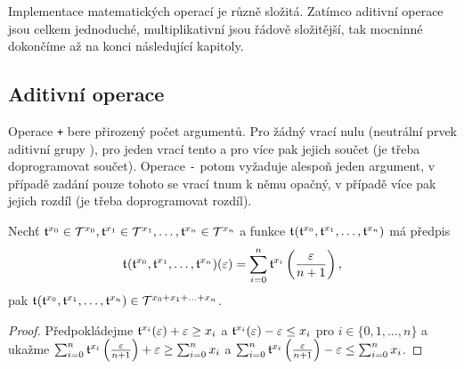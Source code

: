 Implementace matematických operací je různě složitá. Zatímco aditivní operace jsou celkem jednoduché, multiplikativní jsou řádově složitější, tak mocninné dokončíme až na konci následující kapitoly.

\subsection{Aditivní operace}
Operace \texttt{+} bere přirozený počet argumentů. Pro žádný vrací nulu (neutrální prvek aditivní grupy \cite{RachALG1}), pro jeden vrací tento a pro více pak jejich součet (je třeba doprogramovat součet). Operace \texttt{-} potom vyžaduje alespoň jeden argument, v případě zadání pouze tohoto se vrací tnum k němu opačný, v případě více pak jejich rozdíl (je třeba doprogramovat rozdíl).

\begin{theorem}
Nechť $\mathfrak{t}^{x_0}\in\mathcal{T}^{x_0}, \mathfrak{t}^{x_1}\in\mathcal{T}^{x_1}, \ldots, \mathfrak{t}^{x_n}\in\mathcal{T}^{x_n}$ a funkce $\mathfrak{t}^{}(\mathfrak{t}^{x_0},\mathfrak{t}^{x_1},\ldots,\mathfrak{t}^{x_n})$ má předpis
\begin{equation}
\mathfrak{t}^{}(\mathfrak{t}^{x_0},\mathfrak{t}^{x_1},\ldots,\mathfrak{t}^{x_n})(\varepsilon)=\sum_{i=0}^n\mathfrak{t}^{x_i}\left(\frac{\varepsilon}{n+1}\right),
\end{equation}
pak $\mathfrak{t}^{}(\mathfrak{t}^{x_0},\mathfrak{t}^{x_1},\ldots,\mathfrak{t}^{x_n})\in\mathcal{T}^{x_0+x_1+\ldots{+}x_n}$.

\begin{proof}
Předpokládejme $\mathfrak{t}^{x_i}(\varepsilon) + \varepsilon \geq x_i$ a $\mathfrak{t}^{x_i}(\varepsilon) - \varepsilon \leq x_i$ pro $i \in \{0, 1, \ldots , n\}$ a ukažme $\sum_{i=0}^n\mathfrak{t}^{x_i}\left(\frac{\varepsilon}{n+1}\right) + \varepsilon \geq \sum_{i=0}^nx_i$ a $\sum_{i=0}^n\mathfrak{t}^{x_i}\left(\frac{\varepsilon}{n+1}\right) - \varepsilon \leq \sum_{i=0}^nx_i$.


\end{proof}
\end{theorem}

